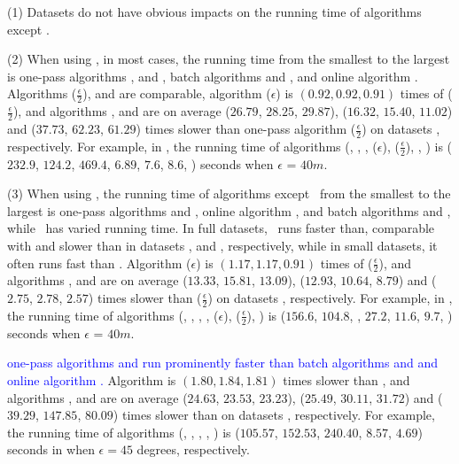 {\sstab (1) {Datasets do not have obvious impacts on the running time of \lsa algorithms except \dagots. }

	
\sstab (2) When using \ped, in most cases, the running time from the smallest to the largest is one-pass algorithms \siped, \operb and , batch algorithms \tpa and \dpa, and online algorithm \bqsa.
Algorithms \siped($\frac{\epsilon}{2}$), {\operb} and  are comparable, algorithm \siped(${\epsilon}$) is $(0.92, 0.92, 0.91)$ times of \siped($\frac{\epsilon}{2}$), and algorithms \tpa, \dpa and \bqsa are on average
($26.79$, $28.25$, $29.87$), ($16.32$, $15.40$, $11.02$) and ($37.73$, $62.23$, $61.29$)
times slower than one-pass algorithm \siped($\frac{\epsilon}{2}$) on datasets \dSets, respectively.
For example, in \mopsi, the running time of algorithms
(\tpa, \dpa, \bqsa, \siped(${\epsilon}$), \siped($\frac{\epsilon}{2}$), \operb,  ) is ($232.9$, $124.2$, $469.4$, $6.89$, $7.6$, $8.6$, ) seconds when $\epsilon$ = $40m$.

\sstab (3) When using \sed, the running time of algorithms except \dagots~from the smallest to the largest is one-pass algorithms \cised and , online algorithm \squishe, and batch algorithms \tpa and \dpa, while \dagots~has varied running time. In full datasets, \dagots~runs faster than, comparable with and slower than \dpa in datasets \ucar, \geolife and \mopsi, respectively, while in small datasets, it often runs fast than \dpa. 
Algorithm \cised(${\epsilon}$) is $(1.17, 1.17, 0.91)$ times of \cised($\frac{\epsilon}{2}$), and algorithms \tpa, \dpa and \squishe are on average
 ($13.33$, $15.81$, $13.09$), ($12.93$, $10.64$, $8.79$) and
($2.75$, $2.78$, $2.57$) times slower than \cised($\frac{\epsilon}{2}$) on datasets \dSets, respectively.
%
For example, in \mopsi, the running time of algorithms
(\tpa, \dpa, {\dagots}, \squishe, \cised($\epsilon$), \cised($\frac{\epsilon}{2}$), ) is ($156.6$, $104.8$, , $27.2$, $11.6$, $9.7$, ) seconds when $\epsilon$ = $40m$.

 \textcolor{blue}{one-pass algorithms \intersec and \interval run prominently faster than batch algorithms \tpa and \dpa and online algorithm \opwa.}
%
%
Algorithm \interval is $(1.80, 1.84, 1.81)$ times slower than \intersec, and algorithms \tpa, \dpa and \opwa are on average
($24.63$, $23.53$, $23.23$), ($25.49$, $30.11$, $31.72$) and ($39.29$, $147.85$, $80.09$)
times slower than \intersec on datasets \dSets, respectively.
%
For example, the running time of algorithms
(\tpa, \dpa, \opwa, \interval, \intersec) is ($105.57$, $152.53$, $240.40$, $8.57$, $4.69$) seconds in \mopsi when
$\epsilon=45$ degrees, respectively.




}
